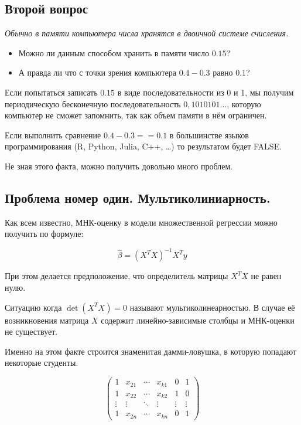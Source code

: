 \documentclass[12pt,a4paper]{article}
\begin{document}
\subsection{Второй вопрос}

\textit{Обычно в памяти компьютера числа хранятся в двоичной системе счисления.}
\begin{itemize}
\item Можно ли данным способом хранить в памяти число $0.15$?
\item А правда ли что с точки зрения компьютера $0.4 - 0.3$ равно $0.1$?
\end{itemize}
Если попытаться записать $0.15$ в виде последовательности из 0 и 1, мы получим периодическую бесконечную последовательность $0,1010101 \dots$, которую компьютер не сможет запомнить, так как объем памяти в нём ограничен.

Если выполнить сравнение $0.4 - 0.3 == 0.1$ в большинстве языков программирования (R, Python, Julia, C++, \ldots) то результатом будет FALSE.

Не зная этого факта, можно получить довольно много проблем.

\subsection{Проблема номер один. Мультиколиниарность.}

Как всем известно, МНК-оценку в модели множественной регрессии можно получить по формуле:


\[ \hat \beta = (X^T X)^{-1} X^T y \] 

При этом делается предположение, что определитель матрицы $X^T X$ не равен нулю. 

Ситуацию когда $\det (X^T X) = 0$ называют мультиколинеарностью. В случае её возникновения матрица  $X$ содержит линейно-зависимые столбцы и МНК-оценки не существует. 

Именно на этом факте строится знаменитая дамми-ловушка, в которую попадают некоторые студенты.


\begin{equation} \label{eq:2} 
 \begin{pmatrix}
  1    & x_{21}    & \cdots  & x_{k1}  & 0      & 1      \\
  1    & x_{22}    & \cdots  & x_{k2}  & 1      & 0      \\
\vdots & \vdots    & \ddots  & \vdots  & \vdots & \vdots \\
  1    & x_{2n}    & \cdots  & x_{kn}  &0       & 1   
 \end{pmatrix}
\end{equation}
\end{document}
